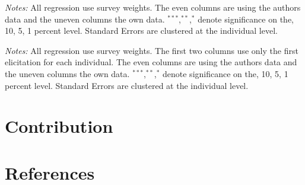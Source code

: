 \documentclass[11pt,a4paper,leqno]{article}
\begin{document}




\begin{center}
	\tiny
	
	\textit{Notes:} All regression use survey weights. The even columns are using the authors data and the uneven columns the own data. $^{{***}}$,$^{{**}}$,$^{{*}}$ denote significance on the, 10, 5, 1 percent level. Standard Errors are clustered at the individual level.
\end{center}



\begin{center}
	
\end{center}

\begin{center}
	\tiny
	
	\textit{Notes:} All regression use survey weights. The first two columns use only the first elicitation for each individual. The even columns are using the authors data and the uneven columns the own data. $^{{***}}$,$^{{**}}$,$^{{*}}$ denote significance on the, 10, 5, 1 percent level. Standard Errors are clustered at the individual level.
\end{center}


\section{Contribution}

\section{References}

\printbibliography
\end{document}
